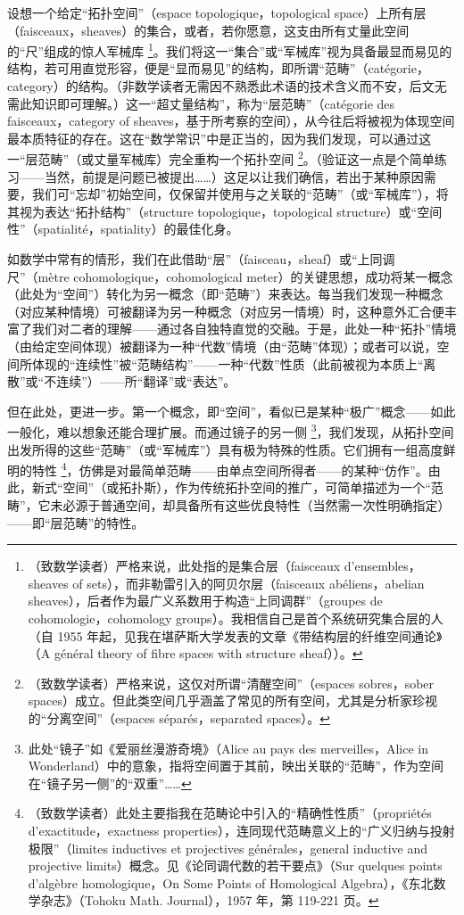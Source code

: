 设想一个给定“拓扑空间”（espace topologique，topological space）上所有层（faisceaux，sheaves）的集合，或者，若你愿意，这支由所有丈量此空间的“尺”组成的惊人军械库 \footnote{（致数学读者）严格来说，此处指的是集合层（faisceaux d’ensembles，sheaves of sets），而非勒雷引入的阿贝尔层（faisceaux abéliens，abelian sheaves），后者作为最广义系数用于构造“上同调群”（groupes de cohomologie，cohomology groups）。我相信自己是首个系统研究集合层的人（自 1955 年起，见我在堪萨斯大学发表的文章《带结构层的纤维空间通论》（A général theory of fibre spaces with structure sheaf））。}。我们将这一“集合”或“军械库”视为具备最显而易见的结构，若可用直觉形容，便是“显而易见”的结构，即所谓“范畴”（catégorie，category）的结构。（非数学读者无需因不熟悉此术语的技术含义而不安，后文无需此知识即可理解。）这一“超丈量结构”，称为“层范畴”（catégorie des faisceaux，category of sheaves，基于所考察的空间），从今往后将被视为体现空间最本质特征的存在。这在“数学常识”中是正当的，因为我们发现，可以通过这一“层范畴”（或丈量军械库）完全重构一个拓扑空间 \footnote{（致数学读者）严格来说，这仅对所谓“清醒空间”（espaces sobres，sober spaces）成立。但此类空间几乎涵盖了常见的所有空间，尤其是分析家珍视的“分离空间”（espaces séparés，separated spaces）。}。（验证这一点是个简单练习——当然，前提是问题已被提出……）这足以让我们确信，若出于某种原因需要，我们可“忘却”初始空间，仅保留并使用与之关联的“范畴”（或“军械库”），将其视为表达“拓扑结构”（structure topologique，topological structure）或“空间性”（spatialité，spatiality）的最佳化身。

如数学中常有的情形，我们在此借助“层”（faisceau，sheaf）或“上同调尺”（mètre cohomologique，cohomological meter）的关键思想，成功将某一概念（此处为“空间”）转化为另一概念（即“范畴”）来表达。每当我们发现一种概念（对应某种情境）可被翻译为另一种概念（对应另一情境）时，这种意外汇合便丰富了我们对二者的理解——通过各自独特直觉的交融。于是，此处一种“拓扑”情境（由给定空间体现）被翻译为一种“代数”情境（由“范畴”体现）；或者可以说，空间所体现的“连续性”被“范畴结构”——一种“代数”性质（此前被视为本质上“离散”或“不连续”）——所“翻译”或“表达”。

但在此处，更进一步。第一个概念，即“空间”，看似已是某种“极广”概念——如此一般化，难以想象还能合理扩展。而通过镜子的另一侧 \footnote{此处“镜子”如《爱丽丝漫游奇境》（Alice au pays des merveilles，Alice in Wonderland）中的意象，指将空间置于其前，映出关联的“范畴”，作为空间在“镜子另一侧”的“双重”……}，我们发现，从拓扑空间出发所得的这些“范畴”（或“军械库”）具有极为特殊的性质。它们拥有一组高度鲜明的特性 \footnote{（致数学读者）此处主要指我在范畴论中引入的“精确性性质”（propriétés d’exactitude，exactness properties），连同现代范畴意义上的“广义归纳与投射极限”（limites inductives et projectives générales，general inductive and projective limits）概念。见《论同调代数的若干要点》（Sur quelques points d’algèbre homologique，On Some Points of Homological Algebra），《东北数学杂志》（Tohoku Math. Journal），1957 年，第 119-221 页。}，仿佛是对最简单范畴——由单点空间所得者——的某种“仿作”。由此，新式“空间”（或拓扑斯），作为传统拓扑空间的推广，可简单描述为一个“范畴”，它未必源于普通空间，却具备所有这些优良特性（当然需一次性明确指定）——即“层范畴”的特性。

